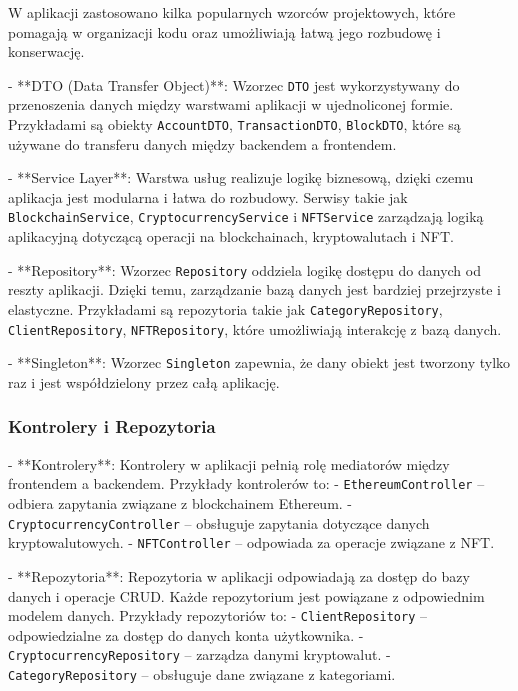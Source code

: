 W aplikacji zastosowano kilka popularnych wzorców projektowych, które pomagają w organizacji kodu oraz umożliwiają łatwą jego rozbudowę i konserwację.

- **DTO (Data Transfer Object)**: Wzorzec \texttt{DTO} jest wykorzystywany do przenoszenia danych między warstwami aplikacji w ujednoliconej formie. Przykładami są obiekty \texttt{AccountDTO}, \texttt{TransactionDTO}, \texttt{BlockDTO}, które są używane do transferu danych między backendem a frontendem.
  
- **Service Layer**: Warstwa usług realizuje logikę biznesową, dzięki czemu aplikacja jest modularna i łatwa do rozbudowy. Serwisy takie jak \texttt{BlockchainService}, \texttt{CryptocurrencyService} i \texttt{NFTService} zarządzają logiką aplikacyjną dotyczącą operacji na blockchainach, kryptowalutach i NFT.

- **Repository**: Wzorzec \texttt{Repository} oddziela logikę dostępu do danych od reszty aplikacji. Dzięki temu, zarządzanie bazą danych jest bardziej przejrzyste i elastyczne. Przykładami są repozytoria takie jak \texttt{CategoryRepository}, \texttt{ClientRepository}, \texttt{NFTRepository}, które umożliwiają interakcję z bazą danych.

- **Singleton**: Wzorzec \texttt{Singleton} zapewnia, że dany obiekt jest tworzony tylko raz i jest współdzielony przez całą aplikację.

\subsubsection{Kontrolery i Repozytoria}

- **Kontrolery**: Kontrolery w aplikacji pełnią rolę mediatorów między frontendem a backendem. Przykłady kontrolerów to:
  - \texttt{EthereumController} – odbiera zapytania związane z blockchainem Ethereum.
  - \texttt{CryptocurrencyController} – obsługuje zapytania dotyczące danych kryptowalutowych.
  - \texttt{NFTController} – odpowiada za operacje związane z NFT.

- **Repozytoria**: Repozytoria w aplikacji odpowiadają za dostęp do bazy danych i operacje CRUD. Każde repozytorium jest powiązane z odpowiednim modelem danych. Przykłady repozytoriów to:
  - \texttt{ClientRepository} – odpowiedzialne za dostęp do danych konta użytkownika.
  - \texttt{CryptocurrencyRepository} – zarządza danymi kryptowalut.
  - \texttt{CategoryRepository} – obsługuje dane związane z kategoriami.